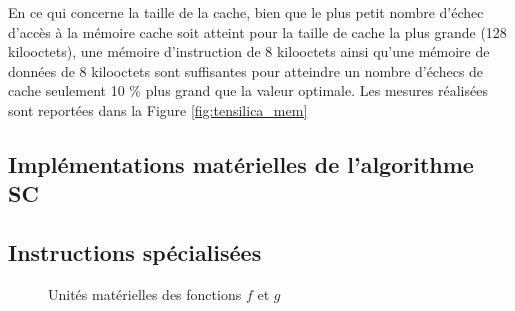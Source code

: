 En ce qui concerne la taille de la cache, bien que le plus petit nombre d'échec d'accès à la mémoire cache soit atteint pour la taille de cache la plus grande (128 kilooctets), une mémoire d'instruction de 8 kilooctets ainsi qu'une mémoire de données de 8 kilooctets sont suffisantes pour atteindre un nombre d'échecs de cache seulement 10 \% plus grand que la valeur optimale. Les mesures réalisées sont reportées dans la Figure \ref{fig:tensilica_mem}

\subsection{Implémentations matérielles de l'algorithme SC}
\subsection{Instructions spécialisées}
\begin{figure}[t]
  \centering
  \caption{Unités matérielles des fonctions $f$ et $g$}
\end{figure}
